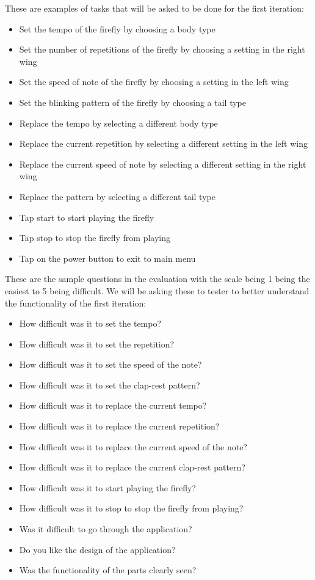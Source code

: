 These are examples of tasks that will be asked to be done for the first iteration:
\begin{itemize}
    \item Set the tempo of the firefly by choosing a body type
    \item Set the number of repetitions of the firefly by choosing a setting in the right wing
    \item Set the speed of note of the firefly by choosing a setting in the left wing
    \item Set the blinking pattern of the firefly by choosing a tail type
    \item Replace the tempo by selecting a different body type
    \item Replace the current repetition by selecting a different setting in the left wing
    \item Replace the current speed of note by selecting a different setting in the right wing
    \item Replace the pattern by selecting a different tail type
    \item Tap start to start playing the firefly
    \item Tap stop to stop the firefly from playing
    \item Tap on the power button to exit to main menu
\end{itemize}

These are the sample questions in the evaluation with the scale being 1 being the easiest to 5 being difficult. We will be asking these to tester to better understand the functionality of the first iteration:

\begin{itemize}
    \item How difficult was it to set the tempo? 
    \item How difficult was it to set the repetition? 
    \item How difficult was it to set the speed of the note? 
    \item How difficult was it to set the clap-rest pattern? 
    \item How difficult was it to replace the current tempo? 
    \item How difficult was it to replace the current repetition? 
    \item How difficult was it to replace the current speed of the note? 
    \item How difficult was it to replace the current clap-rest pattern? 
    \item How difficult was it to start playing the firefly?
    \item How difficult was it to stop to stop the firefly from playing?
    \item Was it difficult to go through the application?
    \item Do you like the design of the application?
    \item Was the functionality of the parts clearly seen?
\end{itemize}

